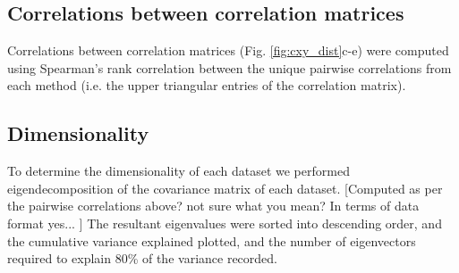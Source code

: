 \documentclass[a4paper,11pt]{article}
\begin{document}
\subsection{Correlations between correlation matrices}
Correlations between correlation matrices (Fig. \ref{fig:cxy_dist}c-e) were computed using Spearman's rank correlation between the unique pairwise correlations from each method (i.e. the upper triangular entries of the correlation matrix). %

\subsection{Dimensionality}
To determine the dimensionality of each dataset we performed eigendecomposition of the covariance matrix of each dataset. [Computed as per the pairwise correlations above? {\color{red}not sure what you mean? In terms of data format yes...} ] The resultant eigenvalues were sorted into descending order, and the cumulative variance explained plotted, and the number of eigenvectors required to explain 80\% of the variance recorded. %




\end{document}
